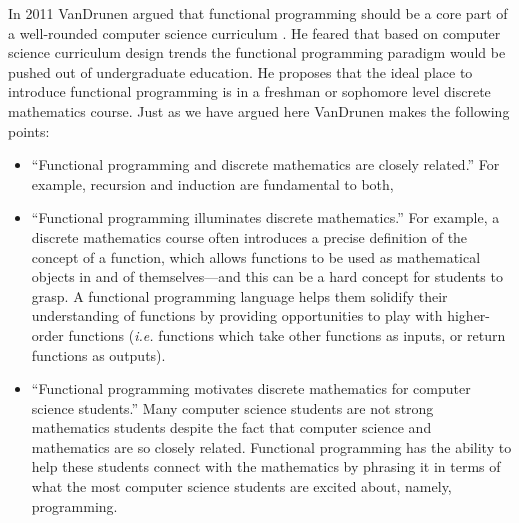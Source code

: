 In 2011 VanDrunen argued that functional programming should be a core
part of a well-rounded computer science curriculum
\cite{VanDrunen:2011}.  He feared that based on computer science
curriculum design trends the functional programming paradigm would be
pushed out of undergraduate education. He proposes that the ideal
place to introduce functional programming is in a freshman or
sophomore level discrete mathematics course.  Just as we have argued
here VanDrunen makes the following points:
\begin{itemize}
\item ``Functional programming and discrete mathematics are closely
  related.''  For example, recursion and induction are fundamental to
  both,
\item ``Functional programming illuminates discrete mathematics.'' For
  example, a discrete mathematics course often introduces a precise
  definition of the concept of a function, which allows functions to
  be used as mathematical objects in and of themselves---and this can
  be a hard concept for students to grasp.  A functional programming
  language helps them solidify their understanding of functions by
  providing opportunities to play with higher-order functions
  (\emph{i.e.} functions which take other functions as inputs, or
  return functions as outputs).
\item ``Functional programming motivates discrete mathematics for
  computer science students.'' Many computer science students are not
  strong mathematics students despite the fact that computer science
  and mathematics are so closely related.  Functional programming has
  the ability to help these students connect with the mathematics by
  phrasing it in terms of what the most computer science students are
  excited about, namely, programming.
\end{itemize}
